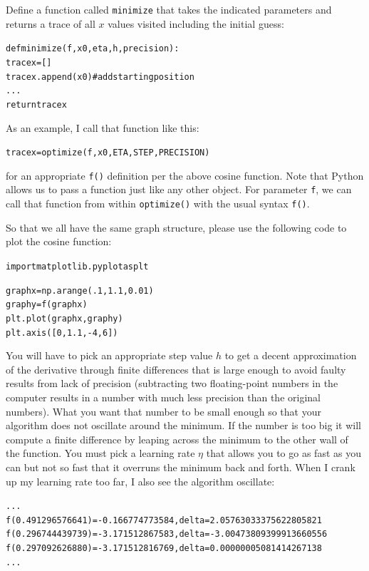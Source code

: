 \begin{fullwidth}
Define a function called {\tt minimize} that takes the indicated parameters and returns a trace of all $x$ values visited including the initial guess:

\begin{alltt}
def minimize(f, x0, eta, h, precision):
    tracex = []
    tracex.append(x0)  # add starting position
    ...
    return tracex
\end{alltt}

As an example, I call that function like this:

\begin{alltt}
tracex = optimize(f, x0, ETA, STEP, PRECISION)
\end{alltt}

\noindent for an appropriate {\tt f()} definition per the above cosine function.  Note that Python allows us to pass a function just like any other object.  For parameter {\tt f}, we can call that function from within {\tt optimize()} with the usual syntax {\tt f()}.

So that we all have the same graph structure, please use the following code to plot the cosine function:

\begin{alltt}
import matplotlib.pyplot as plt

graphx = np.arange(.1,1.1,0.01)
graphy = f(graphx)
plt.plot(graphx,graphy)
plt.axis([0,1.1,-4,6])
\end{alltt}

You will have to pick an appropriate step value $h$ to get a decent approximation of the derivative through finite differences that is large enough to avoid faulty results from lack of precision (subtracting two floating-point numbers in the computer results in a number with much less precision than the original numbers). What you want that number to be small enough so that your algorithm does not oscillate around the minimum. If the number is too big it will compute a finite difference by leaping across the minimum to the other wall of the function. You must pick a learning rate $\eta$ that allows you to go as fast as you can but not so fast that it overruns the minimum back and forth. When I crank up my learning rate too far, I also see the algorithm oscillate:

\begin{alltt}
...
f(0.491296576641) = -0.166774773584 , delta = 2.05763033375622805821
f(0.296744439739) = -3.171512867583 , delta = -3.00473809399913660556
f(0.297092626880) = -3.171512816769 , delta = 0.00000005081414267138
...
\end{alltt}


\end{fullwidth}
